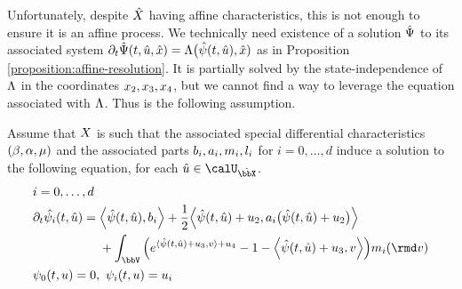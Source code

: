 


Unfortunately, despite $\hat{X}$ having affine characteristics, this is not enough to ensure it is an affine process.
We technically need existence of a solution $\hat{\Psi}$ to its associated system $\partial_t\hat{\Psi}(t, \hat{u}, \hat{x}) = \Lambda\big(\hat{\psi}(t, \hat{u}), \hat{x})$ as in Proposition \ref{proposition:affine-resolution}.
It is partially solved by the state-independence of $\Lambda$ in the coordinates $x_2, x_3, x_4$, but we cannot find a way to leverage the equation associated with $\Lambda$.
Thus is the following assumption.
\begin{assumption}
  \label{assumption:joint-affine}
  Assume that $X$ is such that the associated special differential characteristics $(\beta, \alpha, \mu)$ and the associated parts $b_i, a_i, m_i, l_i$ for $i = 0, \ldots, d$ induce a solution to the following equation, for each $\hat\momentVar\in\boundedSpaceJoint$.
  \begin{equation*}
    \begin{aligned}[t]
      &i = 0, \ldots, d \\
      & \partial_t\hat{\affPart_i}(t, \hat\momentVar) = \begin{aligned}[t]
        &\Bprj{\hat\affPart(t, \hat\momentVar)}{\affDriftPart_i} +  \frac12\Bprj{\hat\affPart(t, \hat\momentVar)+\momentVar_2}{\affDiffPart_i\big(\hat\affPart(t,\hat\momentVar)+\momentVar_2\big)} \\
        &+ \int_\vecSpace \Big( e^{\prj{\hat\affPart(t,\hat\momentVar) + \momentVar_3}{\markVar} + \momentVar_4} - 1 - \Bprj{\hat\affPart(t,\hat\momentVar) + \momentVar_3}{\markVar} \Big) \affJumpPart_i(\rmd\markVar) 
      \end{aligned} \\
      & \affPart_0(t, \momentVar) = 0, ~ \affPart_i(t, \momentVar) = \momentVar_i
    \end{aligned}
  \end{equation*}
\end{assumption}
